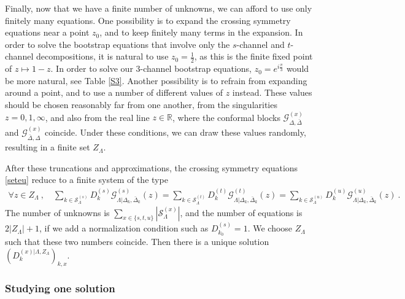 \documentclass[12pt, a4paper]{article}
\begin{document}
Finally, now that we have a finite number of unknowns, we can afford to use only finitely many equations. One possibility is to expand the crossing symmetry equations near a point $z_0$, and to keep finitely many terms in the expansion. In order to solve the bootstrap equations that involve only the $s$-channel and $t$-channel decompositions, it is natural to use $z_0=\frac12$, as this is the finite fixed point of $z\mapsto 1-z$. In order to solve our 3-channel bootstrap equations, $z_0 = e^{i\frac{\pi}{3}}$ would be more natural, see Table \eqref{S3}. Another possibility is to refrain from expanding around a point, and to use a number of different values of $z$ instead. These values should be chosen reasonably far from one another, from the singularities $z=0,1,\infty$, and also from the real line $z\in\mathbb{R}$, where the conformal blocks $\mathcal{G}^{(x)}_{\Delta,\bar\Delta}$ and $\mathcal{G}^{(x)}_{\bar\Delta,\Delta}$ coincide. Under these conditions, we can draw these values randomly, resulting in a finite set $Z_\Lambda$.

After these truncations and approximations, the crossing symmetry equations \eqref{seteu} reduce to a finite system of the type 
\begin{align}
 \forall z\in Z_\Lambda\ , \quad 
 \sum_{k\in\mathcal{S}^{(s)}_\Lambda} D_k^{(s)} \mathcal{G}^{(s)}_{\Lambda|\Delta_k,\bar\Delta_k}(z) 
 = \sum_{k\in\mathcal{S}^{(t)}_\Lambda} D_k^{(t)} \mathcal{G}^{(t)}_{\Lambda|\Delta_k,\bar\Delta_k}(z) 
 = \sum_{k\in\mathcal{S}^{(u)}_\Lambda} D_k^{(u)} \mathcal{G}^{(u)}_{\Lambda|\Delta_k,\bar\Delta_k}(z)\ .
 \label{fziz}
\end{align}
The number of unknowns is $\sum_{x\in\{s,t,u\}}\left|\mathcal{S}^{(x)}_\Lambda\right|$, and the number of equations is $2|Z_\Lambda|+1$, if we add a normalization condition such as $D_{k_0}^{(s)}=1$. We choose $Z_\Lambda$ such that these two numbers coincide. Then there is a unique solution $\left(D_k^{(x)|\Lambda,Z_\Lambda}\right)_{k,x}$.

\subsubsection{Studying one solution}\label{sec:sos}
\end{document}
